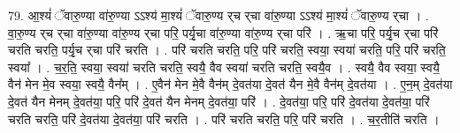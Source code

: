 \documentclass[17pt]{extarticle}
\begin{document}
79. आ॒श्यं॑ ॅवारु॒ण्या वा॑रु॒ण्या ऽऽश्य॑ मा॒श्यं॑ ॅवारु॒ण्य र्‌च र्‌चा वा॑रु॒ण्या ऽऽश्य॑ मा॒श्यं॑ ॅवारु॒ण्य र्‌चा । . वा॒रु॒ण्य र्‌च र्‌चा वा॑रु॒ण्या वा॑रु॒ण्य र्‌चा परि॒ पर्यृ॒चा वा॑रु॒ण्या वा॑रु॒ण्य र्‌चा परि॑ । . ऋ॒चा परि॒ पर्यृ॒च र्‌चा परि॑ चरति चरति॒ पर्यृ॒च र्‌चा परि॑ चरति । . परि॑ चरति चरति॒ परि॒ परि॑ चरति॒ स्वया॒ स्वया॑ चरति॒ परि॒ परि॑ चरति॒ स्वया᳚ । . च॒र॒ति॒ स्वया॒ स्वया॑ चरति चरति॒ स्वयै॒ वैव स्वया॑ चरति चरति॒ स्वयै॒व । . स्वयै॒ वैव स्वया॒ स्वयै॒ वैन॑ मेन मे॒व स्वया॒ स्वयै॒ वैन᳚म् । . ए॒वैन॑ मेन मे॒वै वैन॑म् दे॒वत॑या दे॒वत॑ यैन मे॒वै वैन॑म् दे॒वत॑या । . ए॒न॒म् दे॒वत॑या दे॒वत॑ यैन मेनम् दे॒वत॑या॒ परि॒ परि॑ दे॒वत॑ यैन मेनम् दे॒वत॑या॒ परि॑ । . दे॒वत॑या॒ परि॒ परि॑ दे॒वत॑या दे॒वत॑या॒ परि॑ चरति चरति॒ परि॑ दे॒वत॑या दे॒वत॑या॒ परि॑ चरति । . परि॑ चरति चरति॒ परि॒ परि॑ चरति । . च॒र॒तीति॑ चरति । \newline
\pagebreak
\end{document}
